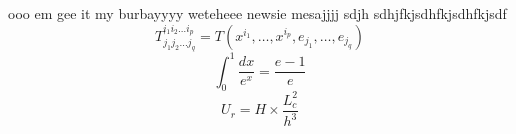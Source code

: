 \documentclass{article}
\begin{document}
ooo em gee it my burbayyyy weteheee
newsie mesajjjj
sdjh
sdhjfkjsdhfkjsdhfkjsdf
\[ T^{i_1 i_2 \dots i_p}_{j_1 j_2 \dots j_q} = T(x^{i_1},\dots,x^{i_p},e_{j_1},\dots,e_{j_q}) \]
\[ \int_0^1 \frac{dx}{e^x} =  \frac{e-1}{e} \]
\[ U_r = H \times \frac{L_c^2}{h^3} \]
\end{document}
